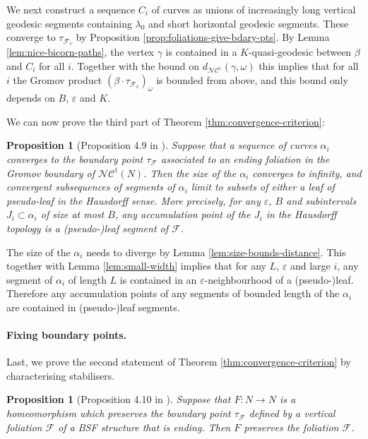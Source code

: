 \documentclass[a4paper]{article}
\let\epsilon\varepsilon %
\newtheorem{proposition}[theorem]{Proposition}
\newcommand{\fncg}{\mathcal{NC}^\dagger}
\begin{document}
We next construct a sequence $C_i$ of curves as unions of increasingly long vertical geodesic segments containing $\lambda_0$ and short horizontal geodesic segments.
These converge to $\tau_{\mathcal{F}_v}$ by Proposition \ref{prop:foliations-give-bdary-pts}.
By Lemma \ref{lem:nice-bicorn-paths}, the vertex $\gamma$ is contained in a $K$-quasi-geodesic between $\beta$ and $C_i$ for all $i$.
Together with the bound on $d_{\fncg}(\gamma, \omega)$ this implies that for all $i$ the Gromov product $(\beta\cdot \tau_{\mathcal{F}_v})_\omega$ is bounded from above, and this bound only depends on $B$, $\epsilon$ and $K$.

We can now prove the third part of Theorem \ref{thm:convergence-criterion}:
\begin{proposition}[Proposition 4.9 in \cite{BHW2}]
Suppose that a sequence of curves $\alpha_i$ converges to the boundary point $\tau_\mathcal{F}$ associated to an ending foliation in the Gromov boundary of $\fncg(N)$.
Then the size of the $\alpha_i$ converges to infinity, and convergent subsequences of segments of $\alpha_i$ limit to subsets of either a leaf of pseudo-leaf in the Hausdorff sense.
More precisely, for any $\epsilon$, $B$ and subintervals $J_i\subset \alpha_i$ of size at most $B$, any accumulation point of the $J_i$ in the Hausdorff topology is a (pseudo-)leaf segment of $\mathcal{F}$.
\end{proposition}

The size of the $\alpha_i$ needs to diverge by Lemma \ref{lem:size-bounds-distance}.
This together with Lemma \ref{lem:small-width} implies that for any $L$, $\epsilon$ and large $i$, any segment of $\alpha_i$ of length $L$ is contained in an $\epsilon$-neighbourhood of a (pseudo-)leaf.
Therefore any accumulation points of any segments of bounded length of the $\alpha_i$ are contained in (pseudo-)leaf segments.

\paragraph{Fixing boundary points.}
Last, we prove the second statement of Theorem \ref{thm:convergence-criterion} by characterising stabilisers.

\begin{proposition}[Proposition 4.10 in \cite{BHW2}]
Suppose that $F\colon N\rightarrow N$ is a homeomorphism which preserves the boundary point $\tau_\mathcal{F}$ defined by a vertical foliation $\mathcal{F}$ of a BSF structure that is ending.
Then $F$ preserves the foliation $\mathcal{F}$.
\end{proposition}
\end{document}
